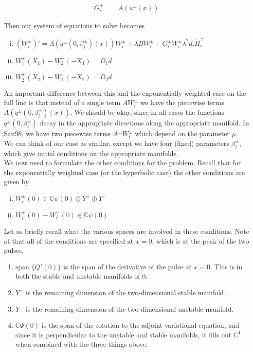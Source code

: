 \documentclass[12pt]{article}
\def\C{{\mathbb C}}
\begin{document}
\begin{align*}
G_i^\pm &= A(u^\pm(x))
\end{align*}

Then our system of equations to solve becomes

\begin{enumerate}[(i)]
\item $(W_i^\pm)' = A(q^\pm(0, \beta_i^\pm)(x)) W_i^\pm + \lambda B W_i^\pm + G_i^\pm W_i^\pm \lambda^2 d_i \tilde{H}_i^\pm$
\item $W_1^+(X_1) - W_2^-(-X_1) = D_1 d$
\item $W_2^+(X_2) - W_1^-(-X_2) = D_2 d$
\end{enumerate}

An important difference between this and the exponentially weighted case on the full line is that instead of a single term $A W_i^\pm$ we have the piecewise terms $A(q^\pm(0, \beta_i^\pm)(x)) $. We should be okay, since in all cases the functions $q^\pm(0, \beta_i^\pm)$ decay in the appropriate directions along the appropriate manifold. In San98, we have two piecewise terms $A^\pm W_i^\pm$ which depend on the parameter $\mu$. We can think of our case as similar, except we have four (fixed) parameters $\beta_i^\pm$, which give initial conditions on the appropriate manifolds.\\

We now need to formulate the other conditions for the problem. Recall that for the exponentially weighted case (or the hyperbolic case) the other conditions are given by

\begin{enumerate}[(i)]
\item $W_i^\pm(0) \in \C \psi(0) \oplus Y^+ \oplus Y^-$
\item $W_i^+(0) - W_i^-(0) \in \C \psi(0)$
\end{enumerate}

Let us briefly recall what the various spaces are involved in these conditions. Note at that all of the conditions are specified at $x = 0$, which is at the peak of the two pulses.

\begin{enumerate}
	\item $\text{span }\{Q'(0)\}$ is the span of the derivative of the pulse at $x = 0$. This is in both the stable and unstable manifolds of 0.
	\item $Y^+$ is the remaining dimension of the two-dimensional stable manifold.
	\item $Y^-$ is the remaining dimension of the two-dimensional unstable manifold.
	\item $\C \Psi(0)$ is the span of the solution to the adjoint variational equation, and since it is perpendicular to the unstable and stable manifolds, it fills out $\C^4$ when combined with the three things above.
\end{enumerate}
\end{document}
